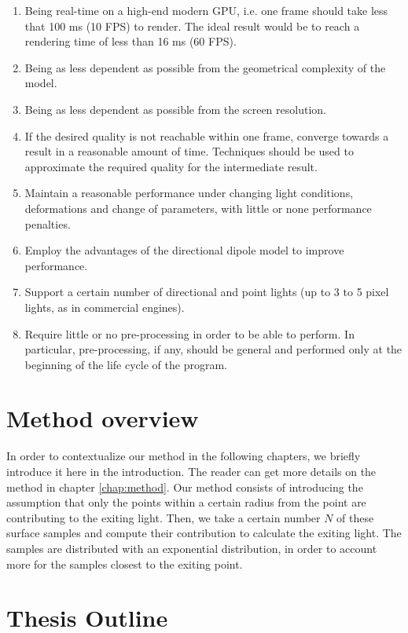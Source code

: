 \begin{enumerate}
	\item Being real-time on a high-end modern GPU, i.e. one frame should take less that 100 ms (10 FPS) to render. The ideal result would be to reach a rendering time of less than 16 ms (60 FPS).
	\item Being as less dependent as possible from the geometrical complexity of the model.
	\item Being as less dependent as possible from the screen resolution.
	\item If the desired quality is not reachable within one frame, converge towards a result in a reasonable amount of time. Techniques should be used to approximate the required quality for the intermediate result. 
	\item Maintain a reasonable performance under changing light conditions, deformations and change of parameters, with little or none performance penalties.
	\item Employ the advantages of the directional dipole model to improve performance.
	\item Support a certain number of directional and point lights (up to 3 to 5 pixel lights, as in commercial engines\citep{unitymanual}).
	\item Require little or no pre-processing in order to be able to perform. In particular, pre-processing, if any, should be general and performed only at the beginning of the life cycle of the program. 
\end{enumerate}

\section{Method overview}

In order to contextualize our method in the following chapters, we briefly introduce it here in the introduction. The reader can get more details on the method in chapter \ref{chap:method}. Our method consists of introducing the assumption that only the points within a certain radius from the point are contributing to the exiting light. Then, we take a certain number $N$ of these surface samples and compute their contribution to calculate the exiting light. The samples are distributed with an exponential distribution, in order to account more for the samples closest to the exiting point. 

\section{Thesis Outline}

